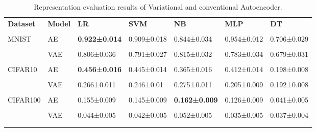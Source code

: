 \begin{table}[h]
    \centering
    \footnotesize
    \begin{tabular}{lllllll}\n\toprule\n \textbf{Dataset} & \textbf{Model} &          \textbf{LR} &         \textbf{SVM} &          \textbf{NB} &         \textbf{MLP} &          \textbf{DT} \\\\\n\midrule\n MNIST &    AE & \textbf{0.922±0.014} & 0.909±0.018 & 0.844±0.034 & 0.954±0.012 & 0.706±0.029 \\\\\n    &   VAE & 0.806±0.036 & 0.791±0.027 & 0.815±0.032 & 0.783±0.034 & 0.679±0.031 \\\\\n CIFAR10 &    AE & \textbf{0.456±0.016} & 0.445±0.014 & 0.365±0.016 & 0.412±0.014 & 0.198±0.008 \\\\\n  &   VAE & 0.266±0.011 &  0.246±0.01 & 0.275±0.011 & 0.205±0.009 & 0.192±0.008 \\\\\n CIFAR100 &    AE & 0.155±0.009 & 0.145±0.009 & \textbf{0.162±0.009} & 0.126±0.009 & 0.041±0.005 \\\\\n  &   VAE & 0.044±0.005 & 0.042±0.005 & 0.052±0.005 & 0.035±0.005 & 0.037±0.004 \\\\\n   \bottomrule\n\end{tabular}\n
    \caption[Representations evaluation for VAE and AE]{Representation evaluation results of Variational and conventional Autoencoder.}
    \label{tab:vae}
\end{table}